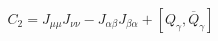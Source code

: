 \begin{equation}
C_2= J_{\mu\mu} J_{\nu\nu} -J_{\alpha\beta} J_{\beta\alpha} + [Q_\gamma, \overline{Q}_\gamma]
\end{equation}

